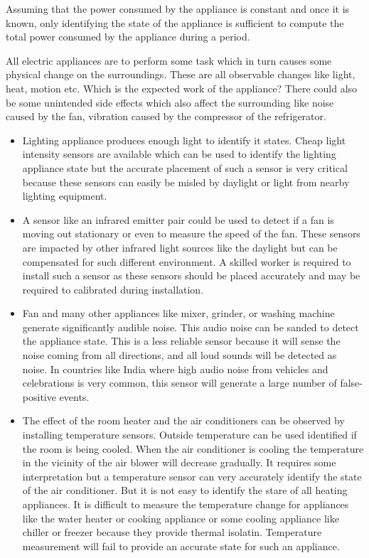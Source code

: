 Assuming that the power consumed by the appliance is constant and once it is known, only identifying the state of the appliance is sufficient to compute the total power consumed by the appliance during a period.

All electric appliances are to perform some task which in turn causes some physical change on the surroundings. These are all observable changes like light, heat, motion etc. Which is the expected work of the appliance? There could also be some unintended side effects which also affect the surrounding like noise caused by the fan, vibration caused by the compressor of the refrigerator.

\begin{itemize}
    \item Lighting appliance produces enough light to identify it states. Cheap light intensity sensors are available which can be used to identify the lighting appliance state but the accurate placement of such a sensor is very critical because these sensors can easily be misled by daylight or light from nearby lighting equipment.
    \item A sensor like an infrared emitter pair could be used to detect if a fan is moving out stationary or even to measure the speed of the fan. These sensors are impacted by other infrared light sources like the daylight but can be compensated for such different environment. A skilled worker is required to install such a sensor as these sensors should be placed accurately and may be required to calibrated during installation.
    \item Fan and many other appliances like mixer, grinder, or washing machine generate significantly audible noise.  This audio noise can be sanded to detect the appliance state. This is a less reliable sensor because it will sense the noise coming from all directions, and all loud sounds will be detected as noise. In countries like India where high audio noise from vehicles and celebrations is very common, this sensor will generate a large number of false-positive events.
    \item The effect of the room heater and the air conditioners can be observed by installing temperature sensors. Outside temperature can be used identified if the room is being cooled. When the air conditioner is cooling the temperature in the vicinity of the air blower will decrease gradually. It requires some interpretation but a temperature sensor can very accurately identify the state of the air conditioner. But it is not easy to identify the stare of all heating appliances. It is difficult to measure the temperature change for appliances like the water heater or cooking appliance or some cooling appliance like chiller or freezer because they provide thermal isolatin. Temperature measurement will fail to provide an accurate state for such an appliance.

\end{itemize}
